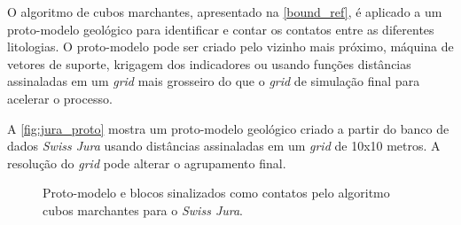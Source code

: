 O algoritmo de cubos marchantes, apresentado na \autoref{bound_ref}, é aplicado a um proto-modelo geológico para identificar e contar os contatos entre as diferentes litologias. O proto-modelo pode ser criado pelo vizinho mais próximo, máquina de vetores de suporte, krigagem dos indicadores ou usando funções distâncias assinaladas em um \textit{grid} mais grosseiro do que o \textit{grid} de simulação final para acelerar o processo.

A \autoref{fig:jura_proto} mostra um proto-modelo geológico criado a partir do banco de dados \textit{Swiss Jura} usando distâncias assinaladas em um \textit{grid} de 10x10 metros. A resolução do \textit{grid} pode alterar o agrupamento final.

\begin{figure}[H]
    \caption{Proto-modelo e blocos sinalizados como contatos pelo algoritmo cubos marchantes para o \textit{Swiss Jura}.} \label{fig:jura_proto}
     \centering
     \hspace{1em}
\end{figure}

